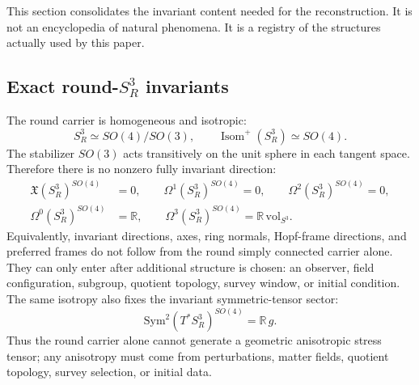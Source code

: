 \documentclass[aps,prd,onecolumn,superscriptaddress,longbibliography,nofootinbib,notitlepage]{revtex4-2}
\begin{document}
This section consolidates the invariant content needed for the reconstruction. It is
not an encyclopedia of natural phenomena. It is a registry of the structures actually
used by this paper.

\subsection{Exact round-\texorpdfstring{$S^3_R$}{S3R} invariants}

The round carrier is homogeneous and isotropic:
\begin{equation}
  S^3_R\simeq SO(4)/SO(3),
  \qquad \operatorname{Isom}^+(S^3_R)\simeq SO(4).
\end{equation}
The stabilizer $SO(3)$ acts transitively on the unit sphere in each tangent space.
Therefore there is no nonzero fully invariant direction:
\begin{equation}
\begin{aligned}
  \mathfrak X(S^3_R)^{SO(4)}&=0,
  \qquad
  \Omega^1(S^3_R)^{SO(4)}=0,
  \qquad
  \Omega^2(S^3_R)^{SO(4)}=0,\\
  \Omega^0(S^3_R)^{SO(4)}&=\mathbb R,
  \qquad
  \Omega^3(S^3_R)^{SO(4)}=\mathbb R\,\mathrm{vol}_{S^3}.
\end{aligned}
\label{eq:full_no_direction_law}
\end{equation}
Equivalently, invariant directions, axes, ring normals, Hopf-frame directions, and
preferred frames do not follow from the round simply connected carrier alone. They can
only enter after additional structure is chosen: an observer, field configuration,
subgroup, quotient topology, survey window, or initial condition. The same isotropy
also fixes the invariant symmetric-tensor sector:
\begin{equation}
  \mathrm{Sym}^2(T^*S^3_R)^{SO(4)}=\mathbb R\,g .
\end{equation}
Thus the round carrier alone cannot generate a geometric anisotropic stress tensor;
any anisotropy must come from perturbations, matter fields, quotient topology, survey
selection, or initial data.
\end{document}
